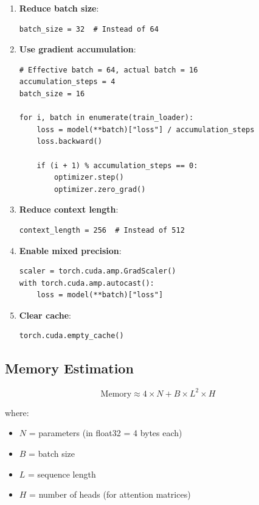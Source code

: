 \begin{enumerate}
    \item \textbf{Reduce batch size}:
    \begin{lstlisting}[style=python]
batch_size = 32  # Instead of 64
    \end{lstlisting}

    \item \textbf{Use gradient accumulation}:
    \begin{lstlisting}[style=python]
# Effective batch = 64, actual batch = 16
accumulation_steps = 4
batch_size = 16

for i, batch in enumerate(train_loader):
    loss = model(**batch)["loss"] / accumulation_steps
    loss.backward()

    if (i + 1) % accumulation_steps == 0:
        optimizer.step()
        optimizer.zero_grad()
    \end{lstlisting}

    \item \textbf{Reduce context length}:
    \begin{lstlisting}[style=python]
context_length = 256  # Instead of 512
    \end{lstlisting}

    \item \textbf{Enable mixed precision}:
    \begin{lstlisting}[style=python]
scaler = torch.cuda.amp.GradScaler()
with torch.cuda.amp.autocast():
    loss = model(**batch)["loss"]
    \end{lstlisting}

    \item \textbf{Clear cache}:
    \begin{lstlisting}[style=python]
torch.cuda.empty_cache()
    \end{lstlisting}
\end{enumerate}

\subsection{Memory Estimation}

\begin{equation}
\text{Memory} \approx 4 \times N + B \times L^2 \times H
\end{equation}

where:
\begin{itemize}
    \item $N$ = parameters (in float32 = 4 bytes each)
    \item $B$ = batch size
    \item $L$ = sequence length
    \item $H$ = number of heads (for attention matrices)
\end{itemize}

